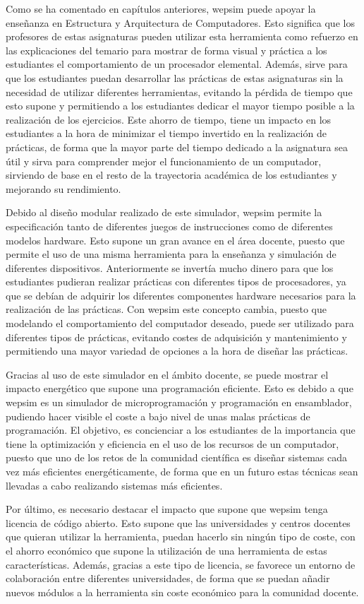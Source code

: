 Como se ha comentado en capítulos anteriores, \acrshort{wepsim} puede apoyar la enseñanza en Estructura y Arquitectura de Computadores. Esto significa que los profesores de estas asignaturas pueden utilizar esta herramienta como refuerzo en las explicaciones del temario para mostrar de forma visual y práctica a los estudiantes el comportamiento de un procesador elemental. Además, sirve para que los estudiantes puedan desarrollar las prácticas de estas asignaturas sin la necesidad de utilizar diferentes herramientas, evitando la pérdida de tiempo que esto supone y permitiendo a los estudiantes dedicar el mayor tiempo posible a la realización de los ejercicios. Este ahorro de tiempo, tiene un impacto en los estudiantes a la hora de minimizar el tiempo invertido en la realización de prácticas, de forma que la mayor parte del tiempo dedicado a la asignatura sea útil y sirva para comprender mejor el funcionamiento de un computador, sirviendo de base en el resto de la trayectoria académica de los estudiantes y mejorando su rendimiento.

Debido al diseño modular realizado de este simulador, \acrshort{wepsim} permite la especificación tanto de diferentes juegos de instrucciones como de diferentes modelos \gls{hardware}. Esto supone un gran avance  en el área docente, puesto que permite el uso de una misma herramienta para la enseñanza y simulación de diferentes dispositivos. Anteriormente se invertía mucho dinero para que los estudiantes pudieran realizar prácticas con diferentes tipos de procesadores, ya que se debían de adquirir los diferentes componentes \gls{hardware} necesarios para la realización de las prácticas. Con \acrshort{wepsim} este concepto cambia, puesto que modelando el comportamiento del computador deseado, puede ser utilizado para diferentes tipos de prácticas, evitando costes de adquisición y mantenimiento y permitiendo una mayor variedad de opciones a la hora de diseñar las prácticas.

Gracias al uso de este simulador en el ámbito docente, se puede mostrar el impacto energético que supone una programación eficiente. Esto es debido a que \acrshort{wepsim} es un simulador de microprogramación y programación en \gls{ensamblador}, pudiendo hacer visible el coste a bajo nivel de unas malas prácticas de programación. El objetivo, es concienciar a los estudiantes de la importancia que tiene la optimización y eficiencia en el uso de los recursos de un computador, puesto que uno de los retos de la comunidad científica es diseñar sistemas cada vez más eficientes energéticamente, de forma que en un futuro estas técnicas sean llevadas a cabo realizando sistemas más eficientes.

Por último, es necesario destacar el impacto que supone que \acrshort{wepsim} tenga licencia de código abierto. Esto supone que las universidades y centros docentes que quieran utilizar la herramienta, puedan hacerlo sin ningún tipo de coste, con el ahorro económico que supone la utilización de una herramienta de estas características. Además, gracias a este tipo de licencia, se favorece un entorno de colaboración entre diferentes universidades, de forma que se puedan añadir nuevos módulos a la herramienta sin coste económico para la comunidad docente.

\fi